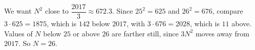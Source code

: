 We want $N^2$ close to $\dfrac{2017}{3}\approx672.3$. Since $25^2=625$ and $26^2=676$, compare $3\cdot625=1875$, which is $142$ below $2017$, with $3\cdot676=2028$, which is $11$ above. Values of $N$ below $25$ or above $26$ are farther still, since $3N^2$ moves away from $2017$. So $N=\boxed{26}$.
